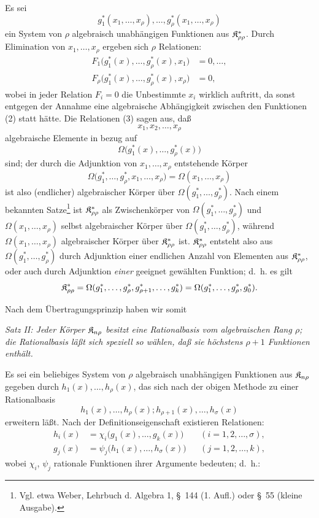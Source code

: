 Es sei
\begin{equation}
  g_1^*(x_1,\ldots,x_\rho),\ldots,
  g_\rho^*(x_1,\ldots,x_\rho)
\tag{2}
\end{equation}
ein System von $\rho$ algebraisch unabhängigen Funktionen aus $\mathfrak{K}^*_{\rho\rho}$. Durch Elimination von $x_1,\ldots,x_\rho$ ergeben sich $\rho$ Relationen:
\begin{equation}
\begin{aligned}
  F_1\bigl(g_1^*(x),\ldots,g_\rho^*(x),x_1\bigr)&=0,\ldots,\\
  F_\rho\bigl(g_1^*(x),\ldots,g_\rho^*(x),x_\rho\bigr)&=0,
\end{aligned}
\tag{3}
\end{equation}
wobei in jeder Relation $F_i=0$ die Unbestimmte $x_i$ wirklich auftritt, da sonst entgegen der Annahme eine algebraische Abhängigkeit zwischen den Funktionen (2) statt hätte. Die Relationen (3) sagen aus, daß
\[
  x_1,x_2,\ldots,x_\rho
\]
algebraische Elemente in bezug auf
\[
  \Omega\bigl(g_1^*(x),\ldots,g_\rho^*(x)\bigr)
\]
sind; der durch die Adjunktion von $x_1,\ldots,x_\rho$ entstehende Körper
\[
  \Omega\bigl(g_1^*,\ldots,g_\rho^*,x_1,
  \ldots,x_\rho\bigr)=\Omega(x_1,\ldots,x_\rho)
\]
ist also (endlicher) algebraischer Körper über $\Omega(g_1^*,\ldots,g_\rho^*)$. Nach einem bekannten Satze\footnote{Vgl. etwa Weber, Lehrbuch d. Algebra 1, \S\ 144 (1. Aufl.) oder \S\ 55 (kleine Ausgabe).} ist $\mathfrak{K}^*_{\rho\rho}$ als Zwischenkörper von $\Omega(g_1^*,\ldots,g_\rho^*)$ und $\Omega(x_1,
\ldots,x_\rho)$ selbst algebraischer Körper über $\Omega(g_1^*,\ldots,g_\rho^*)$, während $\Omega(x_1,
\ldots,x_\rho)$ algebraischer Körper über $\mathfrak{K}^*_{\rho\rho}$ ist. $\mathfrak{K}^*_{\rho\rho}$ entsteht also aus $\Omega(g_1^*,\ldots,g_\rho^*)$ durch Adjunktion einer endlichen Anzahl von Elementen aus $\mathfrak{K}^*_{\rho\rho}$, oder auch durch Adjunktion \emph{einer} geeignet gewählten Funktion; d.~h. es gilt
\[
  \mathfrak{K}^*_{\rho\rho}
  =\Omega(g_1^*,\ldots,g_\rho^*,g_{\rho+1}^*,\ldots,g_k^*)
  =\Omega(g_1^*,\ldots,g_\rho^*,g_0^*).
\]

Nach dem Übertragungsprinzip haben wir somit

\emph{Satz II: Jeder Körper $\mathfrak{K}_{n\rho}$ besitzt eine Rationalbasis vom algebraischen Rang $\rho$; die Rationalbasis läßt sich speziell so wählen, daß sie höchstens $\rho+1$ Funktionen enthält.}

Es sei ein beliebiges System von $\rho$ algebraisch unabhängigen Funktionen aus $\mathfrak{K}_{n\rho}$ gegeben durch $h_1(x),\ldots,h_\rho(x)$, das sich nach der obigen Methode zu einer Rationalbasis
\[
  h_1(x),\ldots,h_\rho(x);
  h_{\rho+1}(x),\ldots,h_\sigma(x)
\]
erweitern läßt. Nach der Definitionseigenschaft existieren Relationen:
\[
\begin{aligned}
  h_i(x)&=\chi_i\bigl(g_1(x),\ldots,g_k(x)\bigr)
    &&(i=1,2,\ldots,\sigma),\\
  g_j(x)&=\psi_j\bigl(h_1(x),\ldots,h_\sigma(x)\bigr)
    &&(j=1,2,\ldots,k),
\end{aligned}
\]
wobei $\chi_i$, $\psi_j$ rationale Funktionen ihrer Argumente bedeuten; d.~h.:

